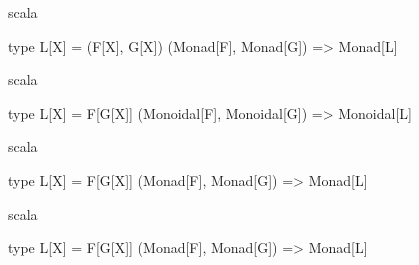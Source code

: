 \documentclass{beamer}
\begin{document}
\begin{frame}[fragile]

  \centering
  \large

  \begin{cminted}{scala}

type L[X] = (F[X], G[X])
(Monad[F], Monad[G]) => Monad[L]

  \end{cminted}

\end{frame}

\begin{frame}[fragile]

  \centering
  \large

  \begin{cminted}{scala}

type L[X] = F[G[X]]
(Monoidal[F], Monoidal[G]) => Monoidal[L]

  \end{cminted}

\end{frame}

\begin{frame}[fragile]

  \centering
  \large

  \begin{cminted}{scala}

type L[X] = F[G[X]]
(Monad[F], Monad[G]) => Monad[L]

  \end{cminted}

\end{frame}

\begin{frame}[fragile]

  \centering
  \large

  \begin{cminted}{scala}

type L[X] = F[G[X]]
(Monad[F], Monad[G]) => Monad[L]

  \end{cminted}

\end{frame}
\end{document}
